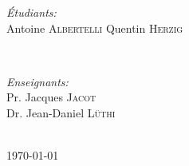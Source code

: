 \begin{titlepage}
\vfill %
\begin{minipage}{0.4\textwidth}
\begin{flushleft} \large
\emph{Étudiants:}\\
Antoine \textsc{Albertelli} 
Quentin \textsc{Herzig}
\end{flushleft}
\end{minipage}
~
\begin{minipage}{0.4\textwidth}
\begin{flushright} \large
\emph{Enseignants:} \\
Pr. Jacques \textsc{Jacot} \\
Dr. Jean-Daniel \textsc{Lüthi}
\end{flushright}
\end{minipage}\\[2cm]


{\large \today}
\end{titlepage}


